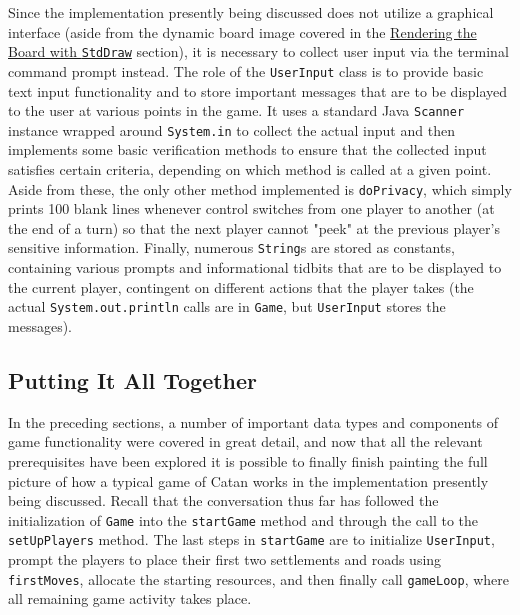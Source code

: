 \documentclass[pageno]{jpaper}
\begin{document}
\begin{doublespacing}
Since the implementation presently being discussed does not utilize a graphical interface (aside from the dynamic board image covered in the \hyperlink{sec:rendering_the_board_with_stddraw}{Rendering the Board with \lstinline$StdDraw$} section), it is necessary to collect user input via the terminal command prompt instead. The role of the \lstinline$UserInput$ class is to provide basic text input functionality and to store important messages that are to be displayed to the user at various points in the game. It uses a standard Java \lstinline$Scanner$ instance wrapped around \lstinline$System.in$ to collect the actual input and then implements some basic verification methods to ensure that the collected input satisfies certain criteria, depending on which method is called at a given point. Aside from these, the only other method implemented is \lstinline$doPrivacy$, which simply prints 100 blank lines whenever control switches from one player to another (at the end of a turn) so that the next player cannot "peek" at the previous player's sensitive information. Finally, numerous \lstinline$String$s are stored as constants, containing various prompts and informational tidbits that are to be displayed to the current player, contingent on different actions that the player takes (the actual \lstinline$System.out.println$ calls are in \lstinline$Game$, but \lstinline$UserInput$ stores the messages).

\hypertarget{sec:putting_it_all_together}{}
\subsection{Putting It All Together}

In the preceding sections, a number of important data types and components of game functionality were covered in great detail, and now that all the relevant prerequisites have been explored it is possible to finally finish painting the full picture of how a typical game of Catan works in the implementation presently being discussed. Recall that the conversation thus far has followed the initialization of \lstinline$Game$ into the \lstinline$startGame$ method and through the call to the \lstinline$setUpPlayers$ method. The last steps in \lstinline$startGame$ are to initialize \lstinline$UserInput$, prompt the players to place their first two settlements and roads using \lstinline$firstMoves$, allocate the starting resources, and then finally call \lstinline$gameLoop$, where all remaining game activity takes place.


\end{doublespacing}
\end{document}
